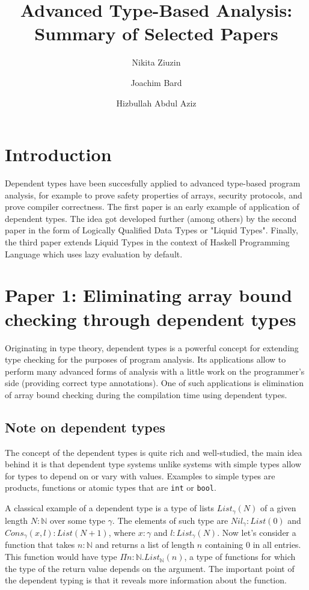 \documentclass[a4paper,UKenglish]{lipics-v2016}
\title{Advanced Type-Based Analysis: Summary of Selected Papers}
\author[1]{Nikita Ziuzin}
\author[2]{Joachim Bard}
\author[3]{Hizbullah Abdul Aziz}
\affil[1]{\texttt{nzyuzin93@gmail.com}}
\affil[2]{\texttt{s9jobard@stud.uni-saarland.de}}
\affil[3]{\texttt{s8hijabb@stud.uni-saarland.de}}
\begin{document}
\maketitle


\section{Introduction}
Dependent types have been succesfully applied to advanced type-based program
analysis, for example to prove safety properties of arrays, security protocols,
and prove compiler correctness.  The first paper is an early example of
application of dependent types.  The idea got developed further (among others)
by the second paper in the form of Logically Qualified Data Types or "Liquid
Types".  Finally, the third paper extends Liquid Types in the context of
Haskell Programming Language which uses lazy evaluation by default.



\section{Paper 1: Eliminating array bound checking through dependent types}

\abstract

Originating in type theory, dependent types is a powerful concept for extending
type checking for the purposes of program analysis. Its applications allow to
perform many advanced forms of analysis with a little work on the programmer's
side (providing correct type annotations). One of such applications is
elimination of array bound checking during the compilation time using dependent
types.

\subsection{Note on dependent types}

The concept of the dependent types is quite rich and well-studied, the main
idea behind it is that dependent type systems unlike systems with simple types
allow for types to depend on or vary with values. Examples to simple types are
products, functions or atomic types that are \texttt{int} or \texttt{bool}.

A classical example of a dependent type is a type of lists $List_\gamma(N)$ of
a given length $N : \mathbb{N}$ over some type $\gamma$. The elements of such
type are $Nil_\gamma : List(0)$ and $Cons_\gamma(x, l) : List(N+1)$, where $x :
\gamma$ and $l : List_\gamma(N)$. Now let's consider a function that takes $n :
\mathbb{N}$ and returns a list of length $n$ containing $0$ in all entries.
This function would have type $\Pi n : \mathbb{N}.List_\mathbb{N}(n)$, a type
of functions for which the type of the return value depends on the argument.
The important point of the dependent typing is that it reveals more information
about the function.
\end{document}
